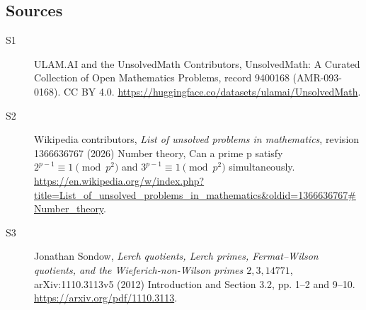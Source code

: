\documentclass[11pt]{article}
\begin{document}
\subsection{Sources}
\begin{description}
\item[\hypertarget{source:9400168:1}{S1}] ULAM.AI and the UnsolvedMath Contributors, UnsolvedMath: A Curated Collection of Open Mathematics Problems, record 9400168 (AMR-093-0168). CC BY 4.0. \url{https://huggingface.co/datasets/ulamai/UnsolvedMath}.
\item[\hypertarget{source:9400168:2}{S2}] Wikipedia contributors, \emph{List of unsolved problems in mathematics}, revision 1366636767 (2026) Number theory, Can a prime p satisfy $2^{p-1}\equiv 1\pmod{p^2}$ and $3^{p-1}\equiv 1\pmod{p^2}$ simultaneously. \url{https://en.wikipedia.org/w/index.php?title=List_of_unsolved_problems_in_mathematics&oldid=1366636767#Number_theory}.
\item[\hypertarget{source:9400168:3}{S3}] Jonathan Sondow, \emph{Lerch quotients, Lerch primes, Fermat--Wilson quotients, and the Wieferich-non-Wilson primes $2,3,14771$}, arXiv:1110.3113v5 (2012) Introduction and Section 3.2, pp. 1--2 and 9--10. \url{https://arxiv.org/pdf/1110.3113}.
\end{description}
\label{end:9400168}
\end{document}
